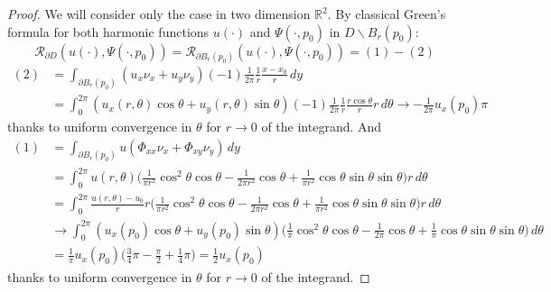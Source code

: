 \documentclass[10pt, a4paper, twoside, openright]{book}
\theoremstyle{definition}
\theoremstyle{plain}
\theoremstyle{plain}
\theoremstyle{plain}
\theoremstyle{plain}
\theoremstyle{plain}
\theoremstyle{plain}
\theoremstyle{plain}
\theoremstyle{plain}
\begin{document}
\begin{proof}
 We will consider only the case in two dimension $\mathbb{R}^2$.
 By classical Green's formula for both harmonic functions $u(\cdot)$ and $\Psi(\cdot,p_0)$ in $D\backslash B_r(p_0)$:
 \[\mathcal{R}_{\partial D}(u(\cdot),\Psi(\cdot,p_0)) = \mathcal{R}_{\partial B_r(p_0)}(u(\cdot),\Psi(\cdot,p_0)) = (1) - (2)\]
 \begin{align*}
 (2)&=\int_{\partial B_r(p_0)}(u_x\nu_x+u_y\nu_y)(-1)\frac{1}{2\pi}\frac{1}{r}\frac{x-x_0}{r}\,dy\\
 &= \int_0^{2\pi}(u_x(r,\theta)\cos\theta+u_y(r,\theta)\sin\theta)(-1)\frac{1}{2\pi}\frac{1}{r}\frac{r\cos\theta}{r}r\,d\theta \to -\frac{1}{2\pi}u_x(p_0)\pi
 \end{align*}
 thanks to uniform convergence in $\theta$ for $r\to0$ of the integrand. And
 \begin{align*}
 (1)&=\int_{\partial B_r(p_0)}u(\Phi_{xx}\nu_x + \Phi_{xy}\nu_y)\,dy\\
 &= \int_0^{2\pi}u(r,\theta)\Big(\frac{1}{\pi r^2}\cos^2\theta\cos\theta - \frac{1}{2\pi r^2}\cos\theta + \frac{1}{\pi r^2}\cos\theta\sin\theta\sin\theta\Big)r\,d\theta\\
 &= \int_0^{2\pi}\frac{u(r,\theta)-u_0}{r}r\Big(\frac{1}{\pi r^2}\cos^2\theta\cos\theta - \frac{1}{2\pi r^2}\cos\theta + \frac{1}{\pi r^2}\cos\theta\sin\theta\sin\theta\Big)r\,d\theta\\
 & \to \int_0^{2\pi}(u_x(p_0)\cos\theta + u_y(p_0)\sin\theta)\Big(\frac{1}{\pi}\cos^2\theta\cos\theta - \frac{1}{2\pi}\cos\theta + \frac{1}{\pi}\cos\theta\sin\theta\sin\theta\Big)\,d\theta\\
 &= \frac{1}{\pi}u_x(p_0)\Big(\frac{3}{4}\pi-\frac{\pi}{2}+\frac{1}{4}\pi\Big) = \frac{1}{2}u_x(p_0)
 \end{align*}
 thanks to uniform convergence in $\theta$ for $r\to0$ of the integrand.
\end{proof}
% 
% 
\end{document}

